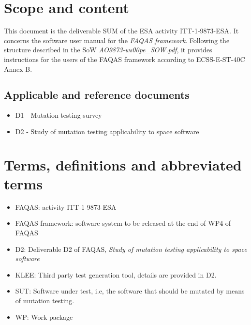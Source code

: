
\chapter{Scope and content}

This document is the deliverable SUM of the ESA activity ITT-1-9873-ESA. It concerns the software user manual for the \emph{FAQAS framework}.
 Following the structure described in the SoW \emph{AO9873-ws00pe\_SOW.pdf}, it provides instructions for the users of the FAQAS framework according to ECSS-E-ST-40C Annex B.
 
\section{Applicable and reference documents}

\begin{itemize}
\item{D1 - Mutation testing survey}
\item{D2 - Study of mutation testing applicability to space software}
\end{itemize}

\chapter{Terms, definitions and abbreviated terms}

\begin{itemize}
\item{FAQAS}: activity ITT-1-9873-ESA
\item{FAQAS-framework}: software system to be released at the end of WP4 of FAQAS
\item{D2}: Deliverable D2 of FAQAS, \emph{Study of mutation testing applicability to space software}
\item{KLEE}: Third party test generation tool, details are provided in D2.
\item{SUT}: Software under test, i.e, the software that should be mutated by means of mutation testing.
\item{WP}: Work package
\end{itemize}

\clearpage
 


